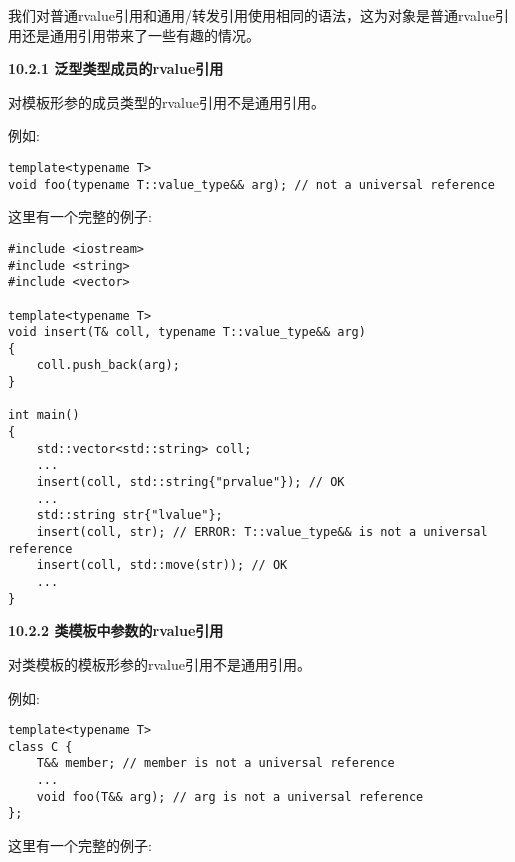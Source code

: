 我们对普通rvalue引用和通用/转发引用使用相同的语法，这为对象是普通rvalue引用还是通用引用带来了一些有趣的情况。\par

\hspace*{\fill} \par %
\textbf{10.2.1 泛型类型成员的rvalue引用}

对模板形参的成员类型的rvalue引用不是通用引用。\par

例如:\par

\begin{lstlisting}[caption={}]
template<typename T>
void foo(typename T::value_type&& arg); // not a universal reference
\end{lstlisting}

这里有一个完整的例子:\par

{\color{red}{generic/universalmem.cpp}}\par

\begin{lstlisting}[caption={}]
#include <iostream>
#include <string>
#include <vector>

template<typename T>
void insert(T& coll, typename T::value_type&& arg)
{
	coll.push_back(arg);
}

int main()
{
	std::vector<std::string> coll;
	...
	insert(coll, std::string{"prvalue"}); // OK
	...
	std::string str{"lvalue"};
	insert(coll, str); // ERROR: T::value_type&& is not a universal reference
	insert(coll, std::move(str)); // OK
	...
}
\end{lstlisting}

\hspace*{\fill} \par %
\textbf{10.2.2 类模板中参数的rvalue引用}

对类模板的模板形参的rvalue引用不是通用引用。\par

例如:\par

\begin{lstlisting}[caption={}]
template<typename T>
class C {
	T&& member; // member is not a universal reference
	...
	void foo(T&& arg); // arg is not a universal reference
};
\end{lstlisting}

这里有一个完整的例子:\par

{\color{red}{generic/universalclass.cpp}}\par

